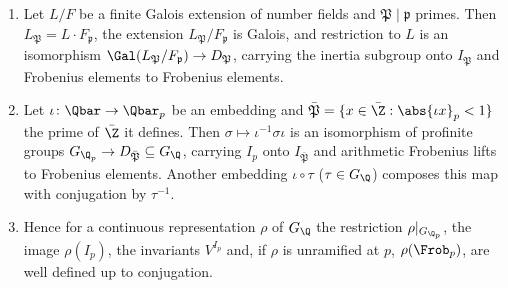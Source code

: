 \begin{proposition}\label{prop:local:decomposition}
\begin{enumerate}[label=(\roman*)]
\item Let $L/F$ be a finite Galois extension of number fields and $\mathfrak P\mid\mathfrak p$ primes. Then $L_{\mathfrak P}=L\cdot F_{\mathfrak p}$, the extension
$L_{\mathfrak P}/F_{\mathfrak p}$ is Galois, and restriction to $L$ is an isomorphism $\Gal(L_{\mathfrak P}/F_{\mathfrak p})\to D_{\mathfrak P}$, carrying the inertia
subgroup onto $I_{\mathfrak P}$ and Frobenius elements to Frobenius elements.
\item Let $\iota\colon\Qbar\to\Qbar_p$ be an embedding and $\bar{\mathfrak P}=\{x\in\bar\Z:\abs{\iota x}_p<1\}$ the prime of $\bar\Z$ it defines. Then
$\sigma\mapsto\iota^{-1}\sigma\iota$ is an isomorphism of profinite groups $G_{\Q_p}\to D_{\bar{\mathfrak P}}\subseteq G_\Q$, carrying $I_p$ onto $I_{\bar{\mathfrak P}}$ and
arithmetic Frobenius lifts to Frobenius elements. Another embedding $\iota\circ\tau$ ($\tau\in G_\Q$) composes this map with conjugation by $\tau^{-1}$.
\item Hence for a continuous representation $\rho$ of $G_\Q$ the restriction $\rho|_{G_{\Q_p}}$, the image $\rho(I_p)$, the invariants $V^{I_p}$ and, if
$\rho$ is unramified at $p$, $\rho(\Frob_p)$, are well defined up to conjugation.
\end{enumerate}
\end{proposition}

